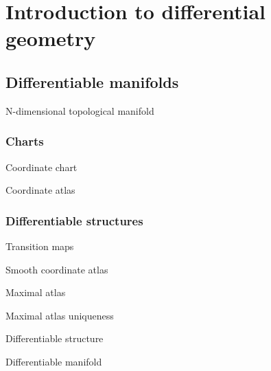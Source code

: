 \chapter{Introduction to differential geometry}

\section{Differentiable manifolds}

\begin{definition}{N-dimensional topological manifold}
\end{definition}

\subsection{Charts}

\begin{definition}{Coordinate chart}
\end{definition}

\begin{definition}{Coordinate atlas}
\end{definition}


\subsection{Differentiable structures}

\begin{definition}{Transition maps}
\end{definition}

\begin{definition}{Smooth coordinate atlas}
\end{definition}

\begin{definition}{Maximal atlas}
\end{definition}

\begin{proposition}{Maximal atlas uniqueness}
\end{proposition}

\begin{definition}{Differentiable structure}
\end{definition}

\begin{definition}{Differentiable manifold}
\end{definition}
